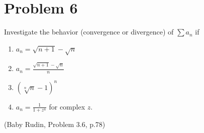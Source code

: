 \documentclass[11pt]{article}
\begin{document}
\pagebreak
\section{Problem 6}
Investigate the behavior (convergence or divergence) of $\sum a_n$ if
\begin{enumerate}[label=(\alph*)]
    \item   $a_n = \sqrt{n + 1} - \sqrt{n}$
    \item   $a_n = \frac{\sqrt{n + 1} - \sqrt{n}}{n}$
    \item   $(\sqrt[n]{n} - 1)^n$
    \item   $a_n = \frac{1}{1 + z^n}$ for complex $z$.
\end{enumerate}
(Baby Rudin, Problem 3.6, p.78)
\end{document}

